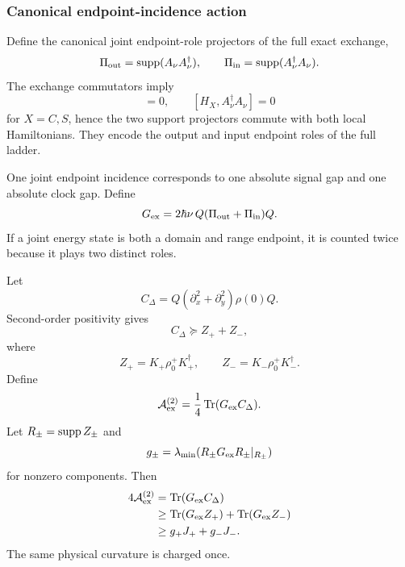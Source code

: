 \subsubsection{Canonical endpoint-incidence action}

Define the canonical joint endpoint-role projectors of the full exact exchange,
\begin{equation}
\Pi_{\rm out}=\operatorname{supp}(A_\nu A_\nu^\dagger),
\qquad
\Pi_{\rm in}=\operatorname{supp}(A_\nu^\dagger A_\nu).
\end{equation}
The exchange commutators imply
\begin{equation}
[H_X,A_\nu A_\nu^\dagger]=0,
\qquad
[H_X,A_\nu^\dagger A_\nu]=0
\end{equation}
for $X=C,S$, hence the two support projectors commute with both local Hamiltonians. They encode the output and input endpoint roles of the full ladder.

One joint endpoint incidence corresponds to one absolute signal gap and one absolute clock gap. Define
\begin{equation}
G_{\rm ex}
=2\hbar\nu\,Q(\Pi_{\rm out}+\Pi_{\rm in})Q.
\label{eq:mixed-proof-Gex}
\end{equation}
If a joint energy state is both a domain and range endpoint, it is counted twice because it plays two distinct roles.

Let
\begin{equation}
C_\Delta=Q(\partial_x^2+\partial_y^2)\rho(0)Q.
\end{equation}
Second-order positivity gives
\begin{equation}
C_\Delta\succeq Z_++Z_-,
\end{equation}
where
\begin{equation}
Z_+=K_+\rho_0^+K_+^\dagger,
\qquad
Z_-=K_-\rho_0^+K_-^\dagger.
\end{equation}
Define
\begin{equation}
\mathcal A_{\rm ex}^{(2)}
=\frac14\operatorname{Tr}(G_{\rm ex}C_\Delta).
\end{equation}
Let $R_\pm=\operatorname{supp} Z_\pm$ and
\begin{equation}
g_\pm=
\lambda_{\min}
(R_\pm G_{\rm ex}R_\pm|_{R_\pm})
\end{equation}
for nonzero components. Then
\begin{align}
4\mathcal A_{\rm ex}^{(2)}
&=\operatorname{Tr}(G_{\rm ex}C_\Delta)\\
&\ge\operatorname{Tr}(G_{\rm ex}Z_+)+\operatorname{Tr}(G_{\rm ex}Z_-)\\
&\ge g_+J_+ +g_-J_-.
\label{eq:mixed-proof-action-budget}
\end{align}
The same physical curvature is charged once.

